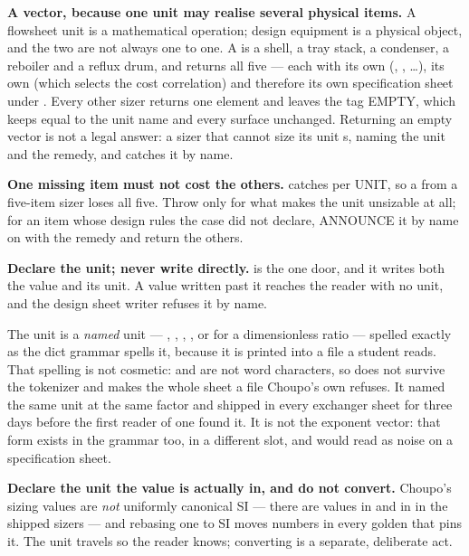 \documentclass[11pt,a4paper]{article}
\begin{document}
\textbf{A vector, because one unit may realise several physical items.}
A flowsheet unit is a mathematical operation; design equipment is a
physical object, and the two are not always one to one. A
 is a shell, a tray stack, a condenser, a
reboiler and a reflux drum, and  returns all five --- each
with its own  (, ,
\dots), its own  (which selects the cost correlation)
and therefore its own specification sheet under
. Every other sizer returns one element
and leaves the tag EMPTY, which keeps 
equal to the unit name and every surface unchanged. Returning an empty
vector is not a legal answer: a sizer that cannot size its unit
s, naming the unit and the remedy, and 
catches it by name.

\begin{pitfall}
\textbf{One missing item must not cost the others.} 
catches per UNIT, so a  from a five-item sizer loses all five.
Throw only for what makes the unit unsizable at all; for an item whose
design rules the case did not declare, ANNOUNCE it by name on
 with the remedy and return the others.
\end{pitfall}

\begin{pitfall}
\textbf{Declare the unit; never write  directly.}
 is the one door, and it writes both the value and its unit.
A value written past it reaches the reader with no unit, and the design
sheet writer refuses it by name.

The unit is a \emph{named} unit --- , , ,
, or \code{-} for a dimensionless ratio --- spelled exactly
as the dict grammar spells it, because it is printed into a file a student
reads. That spelling is not cosmetic: \code{(} and \code{)} are not word
characters, so  does not survive the tokenizer and makes
the whole sheet a file Choupo's own  refuses. It named
the same unit at the same factor and shipped in every exchanger sheet for
three days before the first reader of one found it. It is not the \code{[M L T Theta N]} exponent vector: that form
exists in the grammar too, in a different slot, and would read as noise on
a specification sheet.

\textbf{Declare the unit the value is actually in, and do not convert.}
Choupo's sizing values are \emph{not} uniformly canonical SI --- there are
values in  and in  in the shipped sizers --- and
rebasing one to SI moves numbers in every golden that pins it. The unit
travels so the reader knows; converting is a separate, deliberate act.
\end{pitfall}
\end{document}
